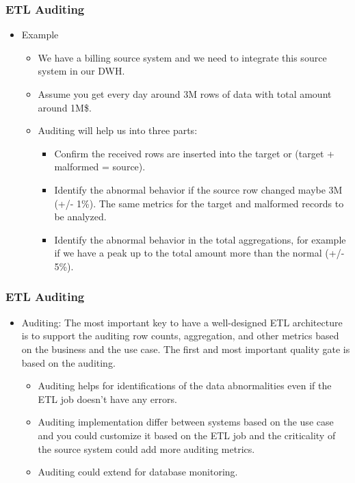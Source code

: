 \begin{frame}
	\frametitle{ETL Auditing}
	\begin{itemize}[<+->]
		\item Example
		\begin{itemize}[<+->]
			\item We have a billing source system and we need to integrate this source system in our DWH.
			\item Assume you get every day around 3M rows of data with total amount around 1M\$.
			\item Auditing will help us into three parts:
			\begin{itemize}[<+->]
				\item Confirm the received rows are inserted into the target or (target + malformed = source).
				\item Identify the abnormal behavior if the source row changed maybe 3M (+/- 1\%). The same metrics for the target and malformed records to be analyzed.
				\item Identify the abnormal behavior in the total aggregations, for example if we have a peak up to the total amount more than the normal (+/- 5\%).
			\end{itemize}
		\end{itemize}
	\end{itemize}
\end{frame}


\begin{frame}
	\frametitle{ETL Auditing}
	\begin{itemize}[<+->]
		\item Auditing: The most important key to have a well-designed ETL architecture is to support the auditing row counts, aggregation, and other metrics based on the business and the use case. The first and most important quality gate is based on the auditing.

		\begin{itemize}[<+->]
			\item Auditing helps for identifications of the data abnormalities even if the ETL job doesn't have any errors.
			\item  Auditing implementation differ between systems based on the use case and you could customize it based on the ETL job and the criticality of the source system could add more auditing metrics.
			\item  Auditing could extend for database monitoring.


		\end{itemize}
	\end{itemize}
\end{frame}


